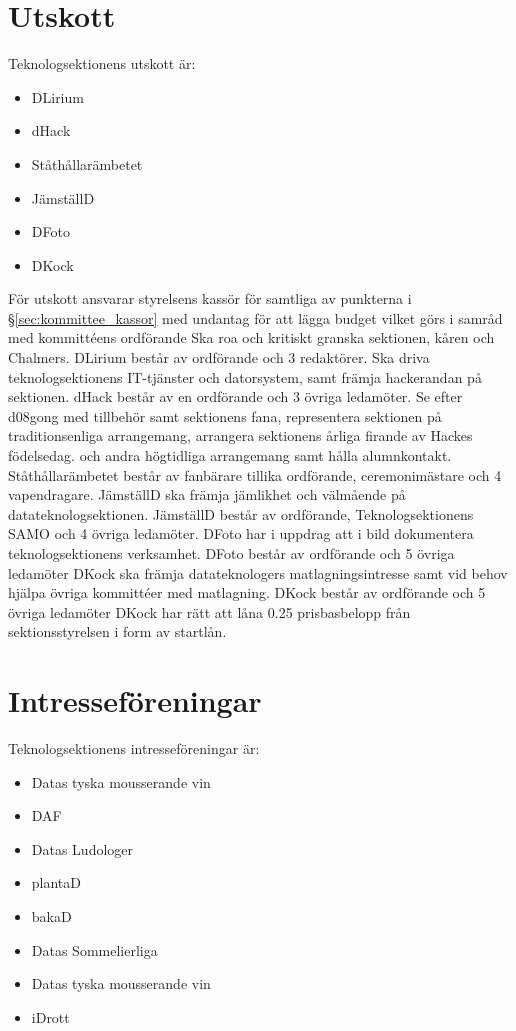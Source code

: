 \documentclass[a4paper]{dteklag}
\newcommand{\prisbasbelopp}[1]{
    #1 prisbasbelopp
    \ifdef{\nuvarandeprisbasbelopp}{
        \marginpar{
            \small{ \textbf{\roundandprint{\xintiexpr#1 * \nuvarandeprisbasbelopp\relax}kr}}
        }
    }{}
}
\begin{document}
\section{Utskott}
\para Teknologsektionens utskott är:
\begin{itemize}
  \item DLirium
  \item dHack
  \item Ståthållarämbetet
  \item JämställD
  \item DFoto
  \item DKock
\end{itemize}
\para För utskott ansvarar styrelsens kassör för samtliga av punkterna i \S\ref{sec:kommittee_kassor} med undantag för att lägga budget vilket görs i samråd med kommittéens ordförande
\para[DLirium] Ska roa och kritiskt granska sektionen, kåren och Chalmers.
\para DLirium består av ordförande och 3 redaktörer.
\para[dHack] Ska driva teknologsektionens IT-tjänster och datorsystem, samt främja hackerandan på sektionen.
\para dHack består av en ordförande och 3 övriga ledamöter.
\para[Ståthållarämbetet] Se efter d08gong med tillbehör samt sektionens fana, representera sektionen på traditionsenliga arrangemang, arrangera sektionens årliga firande av Hackes födelsedag. och andra högtidliga arrangemang samt hålla alumnkontakt.
\para Ståthållarämbetet består av fanbärare tillika ordförande, ceremonimästare och 4 vapendragare.
\para[JämställD] JämställD ska främja jämlikhet och välmående på datateknologsektionen.
\para JämställD består av ordförande, Teknologsektionens SAMO och 4 övriga ledamöter.
\para[DFoto] DFoto har i uppdrag att i bild dokumentera teknologsektionens verksamhet.
\para DFoto består av ordförande och 5 övriga ledamöter
\para[DKock] DKock ska främja datateknologers matlagningsintresse samt vid behov hjälpa övriga kommittéer med matlagning.
\para DKock består av ordförande och 5 övriga ledamöter
\para DKock har rätt att låna \prisbasbelopp{0.25} från sektionsstyrelsen i form av startlån.
\section{Intresseföreningar}
Teknologsektionens intresseföreningar är:
\begin{itemize}
  \item Datas tyska mousserande vin
  \item DAF
  \item Datas Ludologer
  \item plantaD
  \item bakaD
  \item Datas Sommelierliga
  \item Datas tyska mousserande vin
  \item iDrott
\end{itemize}
\end{document}
